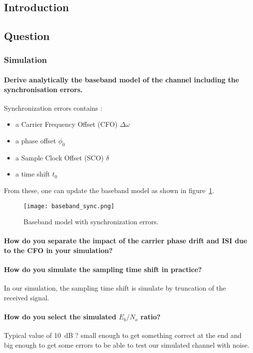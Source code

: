 \subsection{Introduction}


\subsection{Question}
\subsubsection{Simulation}

\paragraph{Derive analytically the baseband model of the channel including the synchronisation errors.} Synchronization errors contains :
\begin{itemize}
\item a Carrier Frequency Offset (CFO) $\Delta \omega$
\item a phase offset $\phi_0$
\item a Sample Clock Offset (SCO) $\delta$
\item a time shift $t_0$
\end{itemize}
From these, one can update the baseband model as shown in figure~\ref{fig:sync}.

\begin{figure}[htbp]
\texttt{[image: baseband\_sync.png]}
\caption{Baseband model with synchronization errors.\label{fig:sync}}
\end{figure}


\paragraph{How do you separate the impact of the carrier phase drift and ISI due to the CFO in your simulation?}

\paragraph{How do you simulate the sampling time shift in practice?} In our simulation, the sampling time shift is simulate by  truncation of the received signal.

\paragraph{How do you select the simulated $E_{b}/N_{o}$ ratio?} Typical value of \SI{10}{\deci\bel} ? small enough to get something correct at the end and big enough to get some errors to be able to test our simulated channel with noise.

